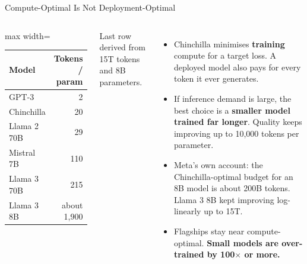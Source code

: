 \begin{frame}{Compute-Optimal Is Not Deployment-Optimal}
    \begin{columns}[T,onlytextwidth]
        \centering
        \small
        \begin{adjustbox}{max width=\linewidth}\begin{tabular}{lr}
            \toprule
            \textbf{Model} & \textbf{Tokens / param} \\
            \midrule
            GPT-3 & 2 \\
            Chinchilla & 20 \\
            Llama 2 70B & 29 \\
            Mistral 7B & 110 \\
            Llama 3 70B & 215 \\
            \rowcolor{KAUSTcyan!12} Llama 3 8B & about 1,900 \\
            \bottomrule
        \end{tabular}\end{adjustbox}

        \vspace{0.3em}
        {\scriptsize Last row derived from 15T tokens and 8B parameters.}
        \begin{itemize}\itemsep0.5em
            \item Chinchilla minimises \textbf{training} compute for a target loss. A deployed model also pays for every token it ever generates.
            \item If inference demand is large, the best choice is a \textbf{smaller model trained far longer}. Quality keeps improving up to 10,000 tokens per parameter.
            \item Meta's own account: the Chinchilla-optimal budget for an 8B model is about 200B tokens. Llama 3 8B kept improving log-linearly up to 15T.
            \item Flagships stay near compute-optimal. \textbf{Small models are over-trained by 100$\times$ or more.}
        \end{itemize}
    \end{columns}
    \vspace{0.3em}
\end{frame}

